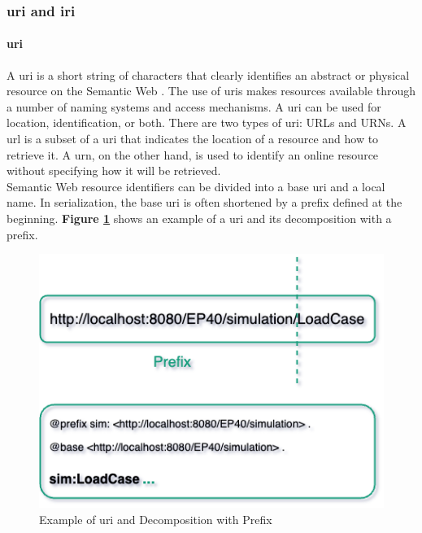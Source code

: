     \subsubsection{\acrshort{uri} and \acrshort{iri}}
        \paragraph{\acrfull{uri}}
        A \acrshort{uri} is a short string of characters that clearly identifies an abstract or physical resource on the Semantic Web \cite{de2016names}. The use of \acrshort{uri}s makes resources available through a number of naming systems and access mechanisms. A \acrshort{uri} can be used for location, identification, or both. There are two types of \acrshort{uri}: URLs and URNs. A \acrfull{url} is a subset of a \acrshort{uri} that indicates the location of a resource and how to retrieve it. A \acrfull{urn}, on the other hand, is used to identify an online resource without specifying how it will be retrieved.\\

        Semantic Web resource identifiers can be divided into a base \acrshort{uri} and a local name. In serialization, the base \acrshort{uri} is often shortened by a prefix defined at the beginning. \textbf{Figure  \ref{fig:uri-example}} shows an example of a \acrshort{uri} and its decomposition with a prefix.\\

        \begin{figure}[h]
            \centering
            \includegraphics[scale=0.6]{images/Foundation-URI Decomposition.drawio.png}
            \caption{\label{fig:uri-example} Example of \acrshort{uri} and Decomposition with Prefix}
        \end{figure}

